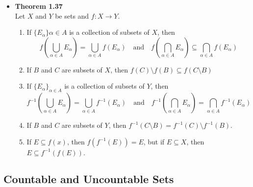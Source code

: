 \documentclass[11pt,a4paper]{article}
\begin{document}
\begin{itemize}
    \item \textbf{Theorem 1.37} \\
        Let $X$ and $Y$ be sets and $f : X \to Y$.
        \begin{enumerate}
            \item If ${\{ E_\alpha \}}{\alpha \in A}$ is a collection of subsets of $X$, then
                \[
                    f \left( \bigcup_{\alpha \in A} E_\alpha \right) =
                    \bigcup_{\alpha \in A} f(E_\alpha)
                    \quad \text{and} \quad
                    f \left( \bigcap_{\alpha \in A} E_\alpha \right) \subseteq
                    \bigcap_{\alpha \in A} f(E_\alpha)
                \]
            \item If $B$ and $C$ are subsets of $X$, then
                $f(C) \setminus f(B) \subseteq f(C \setminus B)$
            \item If ${\{E_\alpha\}}_{\alpha \in A}$ is a collection of subsets of $Y$, then
                \[
                    f^{-1} \left( \bigcup_{\alpha \in A} E_\alpha \right) =
                    \bigcup_{\alpha \in A} f^{-1} (E_\alpha)
                    \quad \text{and} \quad
                    f^{-1} \left( \bigcap_{\alpha \in A} E_\alpha \right) =
                    \bigcap_{\alpha \in A} f^{-1} (E_\alpha)
                \]
            \item If $B$ and $C$ are subsets of $Y$, then
                $f^{-1}(C \setminus B) = f^{-1}(C) \setminus f^{-1}(B)$.
            \item If $E \subseteq f(x)$, then $f(f^{-1}(E)) = E$, but if $E \subseteq X$,
                then $E \subseteq f^{-1}(f(E))$.
        \end{enumerate}

\end{itemize}

\subsection{Countable and Uncountable Sets}
\end{document}
